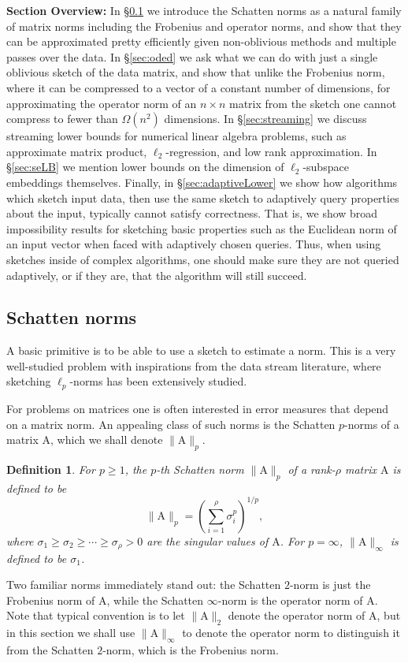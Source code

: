 \documentclass[11pt]{article}
\newtheorem{definition}[theorem]{Definition}
\newcommand{\mat}[1]{{\ensuremath{\bm{\mathrm{#1}}}}}
\def\matA{\mat{A}}
\begin{document}
{\bf Section Overview:} In \S\ref{sec:schatten} we introduce the Schatten norms as a natural family of matrix norms including the Frobenius and operator norms, and show that they can be approximated pretty efficiently given non-oblivious methods and multiple passes over the data. In \S\ref{sec:oded} we ask what we can do with just a single oblivious sketch of the data matrix, and show that unlike the Frobenius norm, where it can be compressed to a vector of a constant number of dimensions, for approximating the operator norm of an $n \times n$ matrix from the sketch one cannot compress to fewer than $\Omega(n^2)$ dimensions. In \S\ref{sec:streaming} we discuss streaming lower bounds for numerical linear algebra problems, such as approximate matrix product, $\ell_2$-regression, and low rank approximation. In \S\ref{sec:seLB} we mention lower bounds on the dimension of $\ell_2$-subspace embeddings themselves. Finally, in \S\ref{sec:adaptiveLower} we show how algorithms which sketch input data, then use the same sketch to adaptively query properties about the input, typically cannot satisfy correctness. That is, we show broad impossibility results for sketching basic properties such as the Euclidean norm of an input vector when faced with adaptively chosen queries. Thus, when using sketches inside of complex algorithms, one should make sure they are not queried adaptively, or if they are, that the algorithm will still succeed. 

\subsection{Schatten norms}\label{sec:schatten}
A basic primitive is to be able to use a sketch to estimate a norm. This is a very well-studied problem with
inspirations from the data stream literature, where sketching $\ell_p$-norms has been extensively studied. 

For problems on matrices one is often interested in error measures that depend on a matrix norm. An 
appealing class of such norms is the Schatten $p$-norms of a matrix $\matA$, which we shall denote $\|\matA\|_p$. 
\begin{definition}\label{def:schatten}
For $p \geq 1$, 
the $p$-th Schatten norm $\|\matA\|_p$ of a rank-$\rho$ matrix $\matA$ is defined to be 
$$\|\matA\|_p = \left (\sum_{i=1}^{\rho} \sigma_i^p \right)^{1/p},$$
where $\sigma_1 \geq \sigma_2 \geq \cdots \geq \sigma_{\rho} > 0$ are the singular values of $\matA$. For
$p = \infty$, $\|\matA\|_{\infty}$ is defined to be $\sigma_1$. 
\end{definition}
Two familiar norms immediately stand out: the Schatten $2$-norm is just the Frobenius norm of $\matA$, while
the Schatten $\infty$-norm is the operator norm of $\matA$. Note that typical convention is to let
$\|\matA\|_2$ denote the operator norm of $\matA$, but in this section we shall use $\|\matA\|_{\infty}$ to denote
the operator norm to distinguish it from the Schatten $2$-norm, which is the Frobenius norm. 
\end{document}
